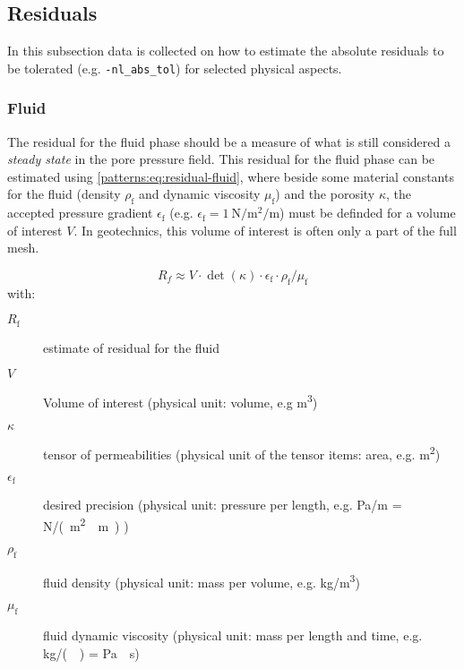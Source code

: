\subsection{Residuals}

In this subsection data is collected on how to estimate the absolute residuals
to be tolerated (e.g. \texttt{-nl\_abs\_tol}) for selected physical aspects.

\subsubsection{Fluid}

The residual for the fluid phase should be a measure of what is still
considered a \emph{steady state} in the pore pressure field. This residual for
the fluid phase can be estimated using \autoref{patterns:eq:residual-fluid},
where beside some material constants for the fluid (density $\rho_\mathrm{f}$
and dynamic viscosity $\mu_\mathrm{f}$) and the porosity $\kappa$, the accepted
pressure gradient $\epsilon_\mathrm{f}$ (e.g. $\epsilon_\mathrm{f} =
    \qty[per-mode = symbol]{1}{\newton\per\square\metre\per\metre} $) must be
definded for a volume of interest $V$. In geotechnics, this volume of interest
is often only a part of the full mesh.

\begin{equation}
    \label{patterns:eq:residual-fluid}
    R_{f} \approx V \cdot \det (\kappa) \cdot \epsilon_\mathrm{f} \cdot \rho_\mathrm{f} / \mu_\mathrm{f}
\end{equation}
with:
\begin{description}
    \item[$R_\mathrm{f}$] estimate of residual for the fluid
    \item[$V$] Volume of interest (physical unit: volume, e.g \unit{\cubic\metre})
    \item[$\kappa$] tensor of permeabilities (physical unit of the tensor items: area, e.g. \unit{\square\metre})
    \item[$\epsilon_\mathrm{f}$] desired precision (physical unit: pressure per length, e.g. \unit[per-mode = symbol]{\pascal\per\metre} = \unit[per-mode = symbol]{\newton\per(\square\metre\cdot\metre)} )
    \item[$\rho_\mathrm{f}$] fluid density (physical unit: mass per volume, e.g. \unit[per-mode = symbol]{\kilogram\per\cubic\metre})
    \item[$\mu_\mathrm{f}$] fluid dynamic viscosity (physical unit: mass per length and time, e.g. \unit[per-mode = symbol]{\kilogram\per({\metre\cdot\second})} = \unit[per-mode = symbol]{\pascal\cdot\second})
\end{description}

